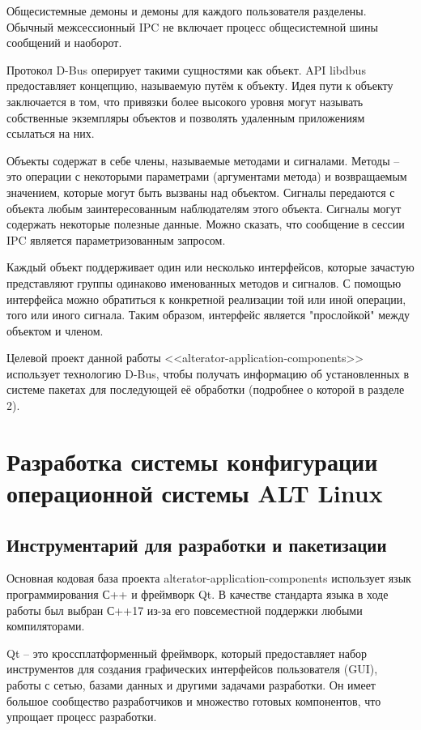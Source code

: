 \documentclass[bachelor, och, pract]{SCWorks}
\begin{document}
Общесистемные демоны и демоны для каждого пользователя разделены.
Обычный межсессионный IPC не включает процесс общесистемной шины сообщений и наоборот.

Протокол D-Bus оперирует такими сущностями как объект.
API libdbus предоставляет концепцию, называемую путём к объекту.
Идея пути к объекту заключается в том, что привязки более высокого уровня могут называть собственные экземпляры объектов и позволять удаленным приложениям ссылаться на них.

Объекты содержат в себе члены, называемые методами и сигналами.
Методы -- это операции с некоторыми параметрами (аргументами метода) и возвращаемым значением, которые могут быть вызваны над объектом.
Сигналы передаются с объекта любым заинтересованным наблюдателям этого объекта.
Сигналы могут содержать некоторые полезные данные. Можно сказать, что сообщение в сессии IPC является параметризованным запросом.

Каждый объект поддерживает один или несколько интерфейсов, которые зачастую представляют группы одинаково именованных методов и сигналов.
С помощью интерфейса можно обратиться к конкретной реализации той или иной операции, того или иного сигнала.
Таким образом, интерфейс является "прослойкой" между объектом и членом\cite{a_dbus}.

Целевой проект данной работы  <<alterator-application-components>> использует технологию D-Bus, чтобы получать информацию об установленных в системе пакетах для последующей её обработки (подробнее о которой в разделе 2).

\newpage

\section{Разработка системы конфигурации операционной системы ALT Linux}

\subsection{Инструментарий для разработки и пакетизации}

Основная кодовая база проекта alterator-application-components использует язык программирования С++ и фреймворк Qt.
В качестве стандарта языка в ходе работы был выбран С++17 из-за его повсеместной поддержки любыми компиляторами.

Qt -- это кроссплатформенный фреймворк, который предоставляет набор инструментов для создания графических интерфейсов пользователя (GUI), работы с сетью, базами данных и другими задачами разработки.
Он имеет большое сообщество разработчиков и множество готовых компонентов, что упрощает процесс разработки\cite{a_qt}.
\end{document}

